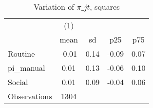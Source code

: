 \begin{table}[htbp]\centering
\def\sym#1{\ifmmode^{#1}\else\(^{#1}\)\fi}
\caption{Variation of $\pi\_{jt}$, squares}
\begin{tabular}{l*{1}{cccc}}
\toprule
                    &\multicolumn{1}{c}{(1)}&            &            &            \\
                    &        mean&          sd&         p25&         p75\\
\midrule
Routine             &       -0.01&        0.14&       -0.09&        0.07\\
pi\_manual           &        0.01&        0.13&       -0.06&        0.10\\
Social              &        0.01&        0.09&       -0.04&        0.06\\
\midrule
Observations        &        1304&            &            &            \\
\bottomrule
\end{tabular}
\end{table}
